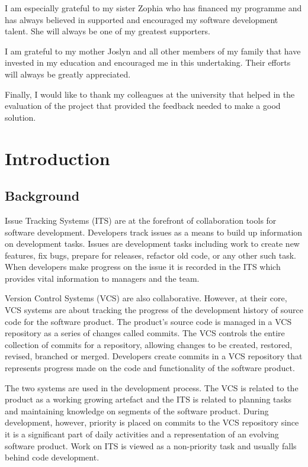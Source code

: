 \documentclass{mproj}
\begin{document}
I am especially grateful to my sister Zophia who has financed my programme and has always believed in supported and encouraged my software development talent. She will always be one of my greatest supporters.

I am grateful to my mother Joslyn and all other members of my family that have invested in my education and encouraged me in this undertaking. Their efforts will always be greatly appreciated.

Finally, I would like to thank my colleagues at the university that helped in the evaluation of the project that provided the feedback needed to make a good solution.

\tableofcontents



\chapter{Introduction}\label{intro}

\section{Background}

Issue Tracking Systems (ITS) are at the forefront of collaboration tools for software development. Developers track issues as a means to build up information on development tasks. Issues are development tasks including work to create new features, fix bugs, prepare for releases, refactor old code, or any other such task. When developers make progress on the  issue it is recorded in the ITS which provides vital information to managers and the team.

Version Control Systems (VCS) are also collaborative. However, at their core, VCS systems are about tracking the progress of the development history of source code for the software product. The product’s source code is managed in a VCS repository as a series of changes called commits. The VCS controls the entire collection of commits for a repository, allowing changes to be created, restored, revised, branched or merged. Developers create commits in a VCS repository that represents progress made on the code and functionality of the software product.

The two systems are used in the development process. The VCS is related to the product as a working growing artefact and the ITS is related to planning tasks and maintaining knowledge on segments of the software product. During development, however, priority is placed on commits to the VCS repository since it is a significant part of daily activities and a representation of an evolving software product. Work on ITS is viewed as a non-priority task and usually falls behind code development.
\end{document}
